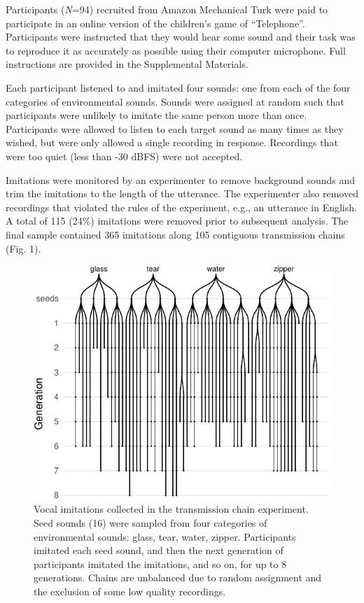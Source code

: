 \documentclass[english,floatsintext,man]{apa6}
\theoremstyle{definition}
\theoremstyle{definition}
\theoremstyle{definition}
\theoremstyle{remark}
\begin{document}
Participants (\emph{N}=94) recruited from Amazon Mechanical Turk were
paid to participate in an online version of the children's game of
\enquote{Telephone}. Participants were instructed that they would hear
some sound and their task was to reproduce it as accurately as possible
using their computer microphone. Full instructions are provided in the
Supplemental Materials.

Each participant listened to and imitated four sounds: one from each of
the four categories of environmental sounds. Sounds were assigned at
random such that participants were unlikely to imitate the same person
more than once. Participants were allowed to listen to each target sound
as many times as they wished, but were only allowed a single recording
in response. Recordings that were too quiet (less than -30 dBFS) were
not accepted.

Imitations were monitored by an experimenter to remove background sounds
and trim the imitations to the length of the utterance. The experimenter
also removed recordings that violated the rules of the experiment, e.g.,
an utterance in English. A total of 115 (24\%) imitations were removed
prior to subsequent analysis. The final sample contained 365 imitations
along 105 contiguous transmission chains (Fig. 1).

\begin{figure}
\centering
\includegraphics{fig1-1.pdf}
\caption{\label{fig:fig1}Vocal imitations collected in the transmission
chain experiment. Seed sounds (16) were sampled from four categories of
environmental sounds: glass, tear, water, zipper. Participants imitated
each seed sound, and then the next generation of participants imitated
the imitations, and so on, for up to 8 generations. Chains are
unbalanced due to random assignment and the exclusion of some low
quality recordings.}
\end{figure}
\end{document}
